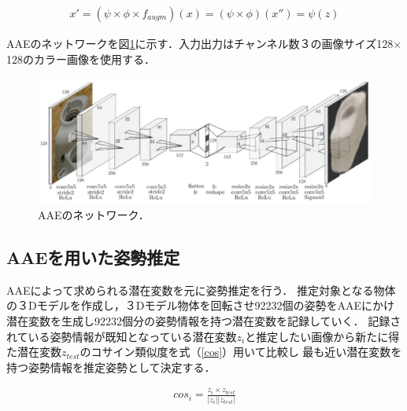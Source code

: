 \begin{eqnarray}
\label{eq:polynomial3}
x ' = (\psi \times  \phi \times f_{augm} )( x ) = (\psi \times \phi) (x'') = \psi (z)
\end{eqnarray}


AAEのネットワークを図\ref{netwa}に示す．入力出力はチャンネル数３の画像サイズ128$\times$128のカラー画像を使用する．

      \begin{figure}[htbp]
      \begin{center}
      \includegraphics[width=120mm]{figure/eps/ネットワーク.eps}
      \caption{AAEのネットワーク\cite{AAE}．}
      \label{netwa}
      \end{center}
      \end{figure}





\subsection{AAEを用いた姿勢推定}


AAEによって求められる潜在変数を元に姿勢推定を行う．
推定対象となる物体の３Dモデルを作成し，３Dモデル物体を回転させ92232個の姿勢をAAEにかけ潜在変数を生成し92232個分の姿勢情報を持つ潜在変数を記録していく．
記録されている姿勢情報が既知となっている潜在変数$ z_i $と推定したい画像から新たに得た潜在変数$z_{test}$のコサイン類似度を式（\ref{cos}）用いて比較し
最も近い潜在変数を持つ姿勢情報を推定姿勢として決定する．

\begin{eqnarray}
\label{cos}
cos_i = \frac {z_i \times z_{test}}{|z_i||z_{test}|}
\end{eqnarray}

